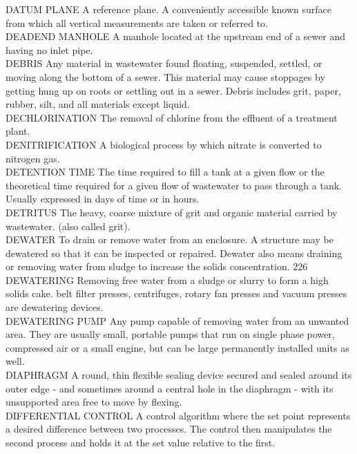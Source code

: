 DATUM PLANE
A reference plane.   A conveniently accessible known surface from which all vertical measurements are taken or referred to.
\vspace{0.3cm}\\
DEADEND MANHOLE
A manhole located at the upstream end of a sewer and having no inlet pipe. 
\vspace{0.3cm}\\
DEBRIS
Any material in wastewater found floating, suspended, settled, or moving along the bottom of a sewer. This material may cause stoppages by getting hung up on roots or settling out in a sewer. Debris includes grit, paper, rubber, silt, and all materials except liquid. 
\vspace{0.3cm}\\
DECHLORINATION
The removal of chlorine from the effluent of a treatment plant.
\vspace{0.3cm}\\
DENITRIFICATION
A biological process by which nitrate is converted to nitrogen gas.
\vspace{0.3cm}\\
DETENTION TIME
The time required to fill a tank at a given flow or the theoretical time required for a given flow of wastewater to pass through a tank.  Usually expressed in days of time or in hours.
\vspace{0.3cm}\\
DETRITUS
The heavy, coarse mixture of grit and organic material carried by wastewater. (also called grit).
\vspace{0.3cm}\\
DEWATER
To drain or remove water from an enclosure. A structure may be dewatered so that it can be inspected or repaired. Dewater also means draining or removing water from sludge to increase the solids concentration. 226 
\vspace{0.3cm}\\
DEWATERING
Removing free water from a sludge or slurry to form a high solids cake. belt filter presses, centrifuges, rotary fan presses and vacuum presses are dewatering devices.
\vspace{0.3cm}\\
DEWATERING PUMP
Any pump capable of removing water from an unwanted area. They are usually small, portable pumps that run on single phase power, compressed air or a small engine, but can be large permanently installed units as well.
\vspace{0.3cm}\\
DIAPHRAGM
A round, thin flexible sealing device secured and sealed around its outer edge - and sometimes around a central hole in the diaphragm - with its unsupported area free to move by flexing.
\vspace{0.3cm}\\
DIFFERENTIAL CONTROL
A control algorithm where the set point represents a desired difference between two processes. The control then manipulates the second process and holds it at the set value relative to the first.
\vspace{0.3cm}\\

